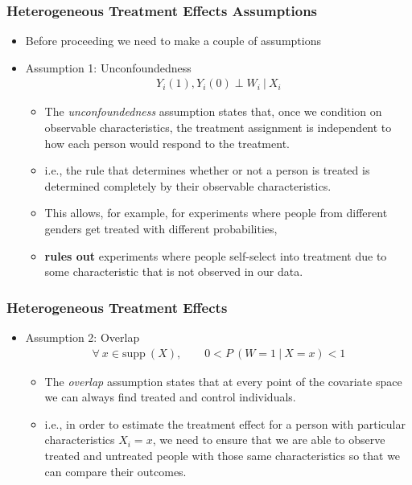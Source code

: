\documentclass[
  shownotes,
  xcolor={svgnames},
  hyperref={colorlinks,citecolor=DarkBlue,linkcolor=DarkRed,urlcolor=DarkBlue}
  , aspectratio=169]{beamer}
\begin{document}
\begin{frame}[fragile]
\frametitle{Heterogeneous Treatment Effects Assumptions}

\begin{itemize}
\item Before proceeding we need to make a couple of assumptions




\item Assumption 1: Unconfoundedness
\begin{align}
Y_i(1), Y_i(0) \perp W_i \ | \ X_i
\end{align}
\begin{itemize}
\item The \emph{unconfoundedness} assumption states that, once we condition on observable characteristics, the treatment assignment is independent to
how each person would respond to the treatment. 
\item i.e.,  the rule that determines whether or not a person is treated is determined completely by their observable characteristics. 
\item This allows, for example, for experiments where people from different genders get treated with different probabilities, 
\item {\bf rules out} experiments where people self-select into treatment due to some characteristic that is not observed in our data.

\end{itemize}


\end{itemize}




\end{frame}
\begin{frame}[fragile]
\frametitle{Heterogeneous Treatment Effects}

\begin{itemize}
\item Assumption 2: Overlap
\medskip
\begin{align}
\forall \ x \in \text{supp}\ (X), \qquad 0 < P\ (W = 1 \ | \ X = x)  < 1
\end{align}

  \begin{itemize}
  \item The \emph{overlap} assumption states that at every point of the covariate space we can always find treated and control individuals.
  \medskip
  \item  i.e., in order to estimate the treatment effect for a person with particular  characteristics \(X_{i} = x\), we need to ensure that we are able to
  observe treated and untreated people with those same characteristics so that we can compare their outcomes. 
  \end{itemize}
\end{itemize}




\end{frame}
\end{document}
